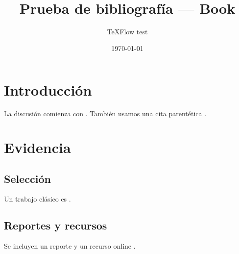 \documentclass[11pt,a4paper]{book}
\title{Prueba de bibliografía — Book}
\author{TeXFlow test}
\date{\today}
\begin{document}
\frontmatter
\maketitle
\tableofcontents

\mainmatter
\chapter{Introducción}
La discusión comienza con \textcite{acemoglu2001}.
También usamos una cita parentética \parencite{angrist2009}.

\chapter{Evidencia}
\section{Selección}
Un trabajo clásico es \textcite{heckman1979}.

\section{Reportes y recursos}
Se incluyen un reporte \parencite{worldbank2024} y un recurso online \parencite{ourworld2025}.

\backmatter
\printbibliography[heading=bibintoc,title={Bibliografía}]
\end{document}
